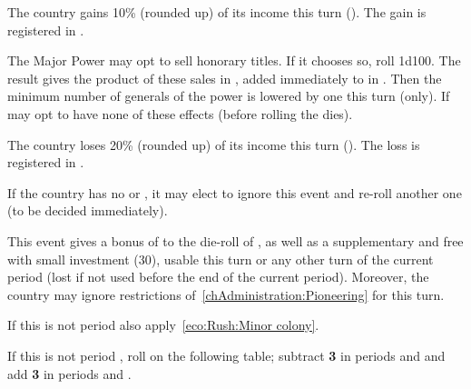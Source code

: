 
The country gains 10\% (rounded up) of its income this turn
(). The gain is registered in .




The Major Power may opt to sell honorary titles. If it chooses so, roll 1d100.
The result gives the product of these sales in \xducats, added immediately to
 in .  Then the
minimum number of generals of the power is lowered by one this turn (only).
If may opt to have none of these effects (before rolling the dies).




The country loses 20\% (rounded up) of its income this turn
(). The loss is registered in .




If the country has no \COLaction or \TPaction, it may elect to ignore this
event and re-roll another one (to be decided immediately).

This event gives a bonus of  to the die-roll of \COLaction, as well
as a supplementary and free \COLaction with small investment (30\ducats),
usable this turn or any other turn of the current period (lost if not used
before the end of the current period). Moreover, the country may ignore
restrictions of~\ref{chAdministration:Pioneering} for this turn.

If this is not period  also apply~\ref{eco:Rush:Minor colony}.



If this is not period , roll on the following table; subtract {\bf
  3} in periods  and  and add {\bf 3} in periods
 and .

